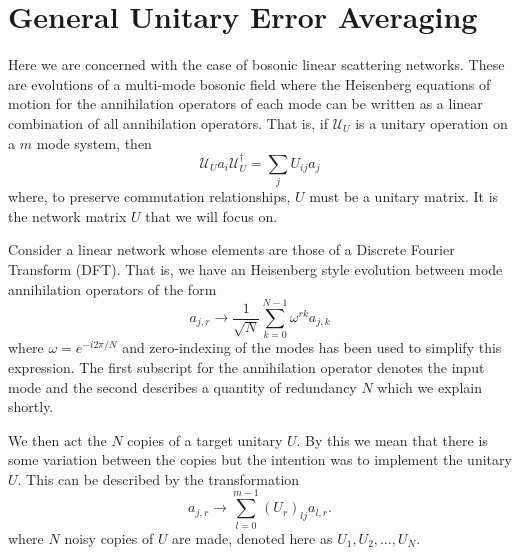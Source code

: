 \documentclass[aps,pra,twocolumn,superscriptaddress,numerical,floatfix]{revtex4-1}
\begin{document}
\section{General Unitary Error Averaging\label{gen case}}

Here we are concerned with the case of bosonic linear scattering networks.  These are evolutions of a multi-mode bosonic field where the Heisenberg equations of motion for the annihilation operators of each mode can be written as a linear combination of all annihilation operators.  That is, if $\mathcal{U}_U$ is a unitary operation on a $m$ mode system, then
\begin{equation}
	\mathcal{U}_U a_i \mathcal{U}_U^\dagger = \sum_j U_{ij} a_j
\end{equation}
where, to preserve commutation relationships, $U$ must be a unitary matrix.  It is the network matrix $U$ that we will focus on.

Consider a linear network whose elements are those of a Discrete Fourier Transform (DFT).  That is, we have an Heisenberg style evolution between mode annihilation operators of the form
\begin{equation}
	a_{j,r} \rightarrow \frac{1}{\sqrt{N}} \sum_{k=0}^{N-1} \omega^{rk} a_{j,k}	
\end{equation}
where $\omega = e^{-i2\pi /N}$ and zero-indexing of the modes has been used to simplify this expression.  The first subscript for the annihilation operator denotes the input mode and the second describes a quantity of redundancy $N$ which we explain shortly. 

We then act the $N$ copies of a target unitary $U$.  By this we mean that there is some variation between the copies but the intention was to implement the unitary $U$.  This can be described by the transformation
\begin{equation}
	a_{j,r} \rightarrow \sum_{l=0}^{m-1} (U_r)_{lj} a_{l,r}.
\end{equation}
where $N$ noisy copies of $U$ are made, denoted here as $U_1, U_2, \ldots, U_N$. 
\end{document}
